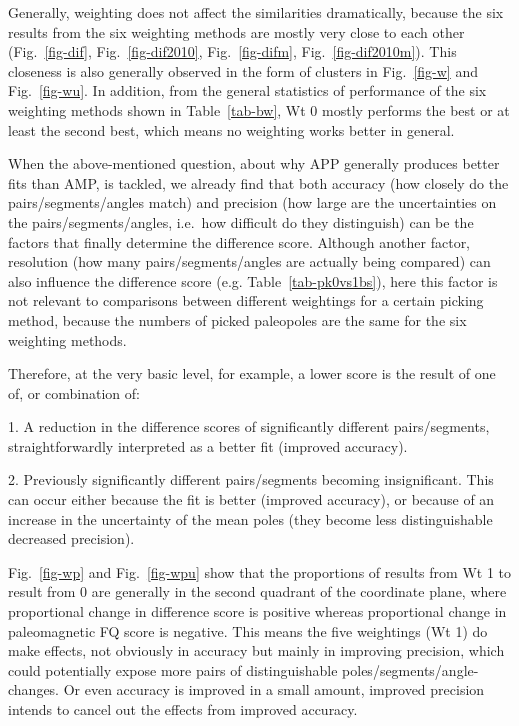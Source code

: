 Generally, weighting does not affect the similarities dramatically, because the
six results from the six weighting methods are mostly very close to each other
(Fig.~\ref{fig-dif}, Fig.~\ref{fig-dif2010}, Fig.~\ref{fig-difm},
Fig.~\ref{fig-dif2010m}). This closeness is also generally observed in the form
of clusters in Fig.~\ref{fig-w} and Fig.~\ref{fig-wu}. In addition, from the
general statistics of performance of the six weighting methods shown in
Table~\ref{tab-bw}, Wt 0 mostly performs the best or at least the
second best, which means no weighting works better in general.

When the above-mentioned question, about why APP generally produces better fits
than AMP, is tackled, we already find that both accuracy (how closely do the
pairs/segments/angles match) and precision (how large are the uncertainties on
the pairs/segments/angles, i.e.\ how difficult do they distinguish) can be the
factors that finally determine the difference score. Although another factor,
resolution (how many pairs/segments/angles are actually being compared) can
also influence the difference score (e.g. Table~\ref{tab-pk0vs1bs}), here this
factor is not relevant to comparisons between different weightings for a
certain picking method, because the numbers of picked paleopoles are the same
for the six weighting methods.

Therefore, at the very basic level, for example, a lower score is the result of
one of, or combination of:

1. A reduction in the difference scores of significantly different
pairs/segments, straightforwardly interpreted as a better fit (improved
accuracy).

2. Previously significantly different pairs/segments becoming insignificant.
This can occur either because the fit is better (improved accuracy), or because
of an increase in the uncertainty of the mean poles (they become less
distinguishable \textemdash{} decreased precision).

Fig.~\ref{fig-wp} and Fig.~\ref{fig-wpu} show that the proportions of results
from Wt 1 to result from 0 are generally in the second
quadrant of the coordinate plane, where proportional change in difference score
is positive whereas proportional change in paleomagnetic FQ score is negative.
This means the five weightings (Wt 1) do make effects, not obviously
in accuracy but mainly in improving precision, which could potentially expose
more pairs of distinguishable poles/segments/angle-changes. Or even accuracy is
improved in a small amount, improved precision intends to cancel out the effects
from improved accuracy.

